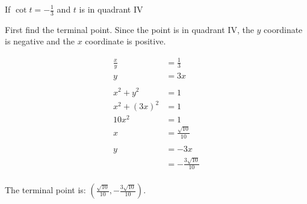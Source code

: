 \documentclass{exam}
\begin{document}
\begin{questions}

    \question
      If $\cot t = - \frac{1}{3}$ and $t$ is in quadrant IV

      \begin{solution}
        First find the terminal point.  Since the point is in quadrant IV, the $y$ coordinate is negative and the $x$
        coordinate is positive.

        \begin{align*}
          \frac{x}{y}  & = \frac{1}{3} \\
          y            & = 3x \\
          \\
          x^2 + y^2    & = 1 \\
          x^2 + (3x)^2 & = 1 \\
          10 x^2       & = 1 \\
          x            & = \frac{\sqrt{10}}{10} \\
          \\
          y            & = -3x \\
                       & = -\frac{3 \sqrt{10}}{10}  \\
        \end{align*}

        The terminal point is: $\left( \frac{\sqrt{10}}{10}, -\frac{3 \sqrt{10}}{10} \right)$.

      \end{solution}

\end{questions}
\end{document}
